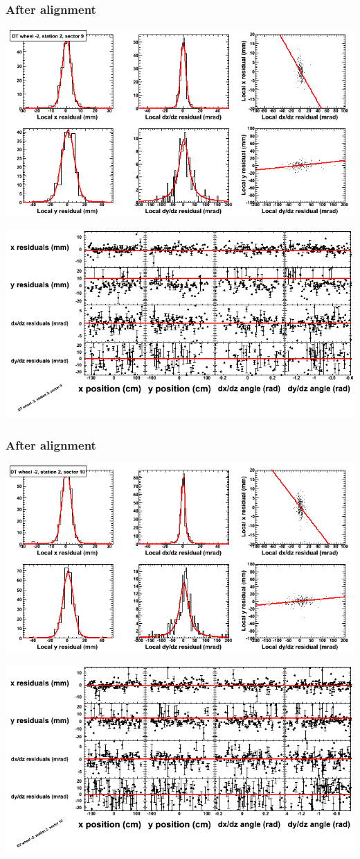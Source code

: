 \documentclass[compress]{beamer}
\begin{document}
\begin{frame}
\frametitle{After alignment}
\includegraphics[width=0.7\linewidth]{NOV4_fitfunctions/MBwhAst2sec09_bellcurves.png}

\includegraphics[width=0.7\linewidth]{NOV4_fitfunctions/MBwhAst2sec09_polynomials.png}
\end{frame}

\begin{frame}
\frametitle{After alignment}
\includegraphics[width=0.7\linewidth]{NOV4_fitfunctions/MBwhAst2sec10_bellcurves.png}

\includegraphics[width=0.7\linewidth]{NOV4_fitfunctions/MBwhAst2sec10_polynomials.png}
\end{frame}
\end{document}
